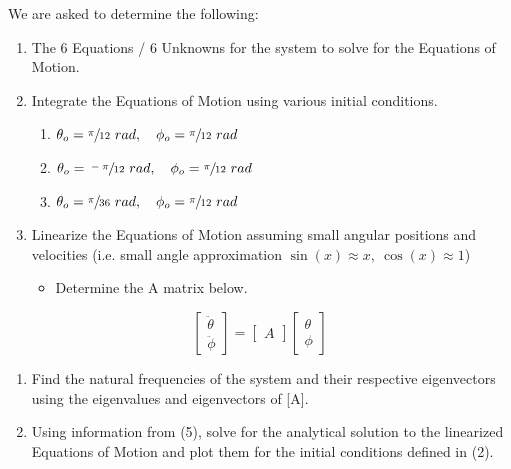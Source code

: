 \documentclass[12pt]{report}
\begin{document}
\begin{flushleft}
We are asked to determine the following: \\
\begin{enumerate}
  \item The 6 Equations / 6 Unknowns for the system to solve for the Equations of Motion.
  \item Integrate the Equations of Motion using various initial conditions.
  \begin{enumerate}
    \item $\theta_o = \sfrac{\pi}{12}~rad, \quad \phi_o = \sfrac{\pi}{12}~rad$
    \item $\theta_o = \sfrac{-\pi}{12}~rad, \quad \phi_o = \sfrac{\pi}{12}~rad$
    \item $\theta_o = \sfrac{\pi}{36}~rad, \quad \phi_o = \sfrac{\pi}{12}~rad$
  \end{enumerate}
  \item Linearize the Equations of Motion assuming small angular positions and velocities
  (i.e. small angle approximation $\sin(x) \approx x,~\cos(x) \approx 1$)
  \begin{itemize}
    \item Determine the A matrix below.
  \end{itemize}
\end{enumerate}
\begin{equation}
\begin{bmatrix}
  \ddot{\theta} \\
  \ddot{\phi}
\end{bmatrix}
=
\begin{bmatrix}
A
\end{bmatrix}
\begin{bmatrix}
\theta \\
\phi
\end{bmatrix}
\nonumber
\end{equation}
\begin{enumerate}[resume]
  \item Find the natural frequencies of the system and their respective eigenvectors
  using the eigenvalues and eigenvectors of [A].
  \item Using information from (5), solve for the analytical solution to the
  linearized Equations of Motion and plot them for the initial conditions defined in (2).
\end{enumerate}
\newpage


\end{flushleft}
\end{document}
